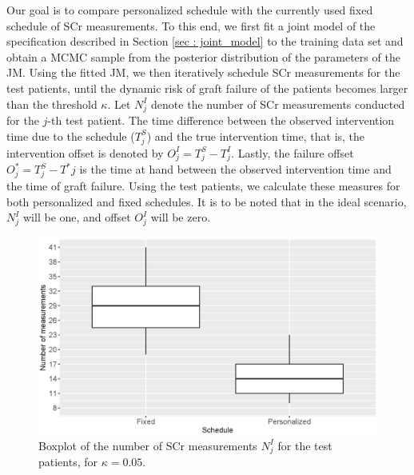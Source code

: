 Our goal is to compare personalized schedule with the currently used fixed schedule of SCr measurements. To this end, we first fit a joint model of the specification described in Section \ref{sec : joint_model} to the training data set and obtain a MCMC sample from the posterior distribution of the parameters of the JM. Using the fitted JM, we then iteratively schedule SCr measurements for the test patients, until the dynamic risk of graft failure \citep{rizopoulos2011dynamic} of the patients becomes larger than the threshold $\kappa$. Let $N^I_j$ denote the number of SCr measurements conducted for the $j$-th test patient. The time difference between the observed intervention time due to the schedule ($T^S_j$) and the true intervention time, that is, the intervention offset is denoted by $O^I_j = T^S_j - T^I_j$. Lastly, the failure offset $O^*_j = T^S_j - T^*j$ is the time at hand between the observed intervention time and the time of graft failure. Using the test patients, we calculate these measures for both personalized and fixed schedules. It is to be noted that in the ideal scenario, $N^I_j$ will be one, and offset $O^I_j$ will be zero. 

\begin{figure}[!htb]
\centerline{\includegraphics[width=\columnwidth]{images/nObspt05.eps}}
\caption{Boxplot of the number of SCr measurements $N^I_j$ for the test patients, for $\kappa = 0.05$.}
\label{fig : nObspt05}
\end{figure}

